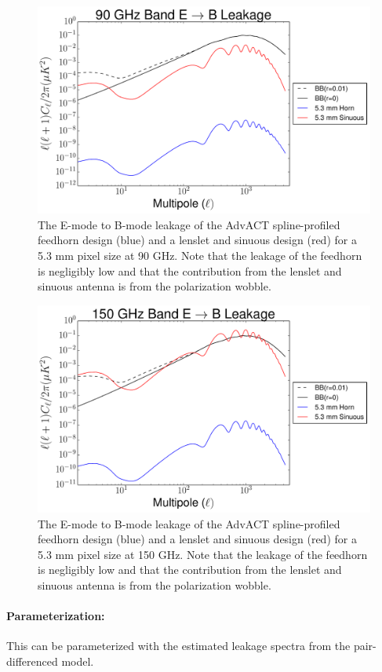 \begin{figure}[h!]
\centering
\includegraphics[width=\textwidth]{figures/90GHz_band_UEE_pixel_size_horn_sinuous_5p3mm.pdf}
\caption{The E-mode to B-mode leakage of the AdvACT spline-profiled feedhorn design (blue) and a lenslet and sinuous design (red) for a 5.3 mm pixel size at 90 GHz. Note that the leakage of the feedhorn is negligibly low and that the contribution from the lenslet and sinuous antenna is from the polarization wobble.}
\label{fig:MF_90_EB_leakage}
\end{figure}

\begin{figure}[h!]
\centering
\includegraphics[width=\textwidth]{figures/150GHz_band_UEE_pixel_size_horn_sinuous_5p3mm.pdf}
\caption{The E-mode to B-mode leakage of the AdvACT spline-profiled feedhorn design (blue) and a lenslet and sinuous design (red) for a 5.3 mm pixel size at 150 GHz. Note that the leakage of the feedhorn is negligibly low and that the contribution from the lenslet and sinuous antenna is from the polarization wobble.}
\label{fig:MF_150_EB_leakage}
\end{figure}

\paragraph{Parameterization:}
This can be parameterized with the estimated leakage spectra from the pair-differenced model.

\clearpage
